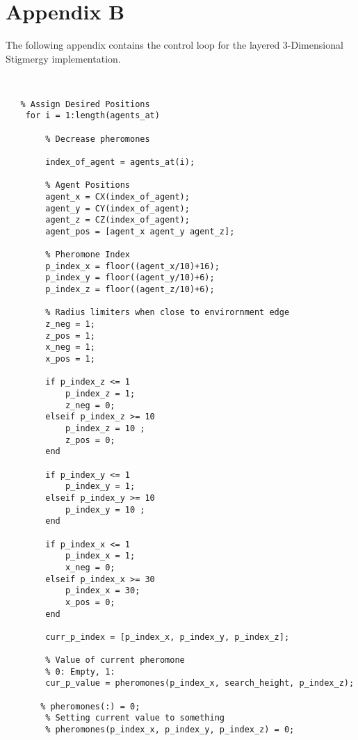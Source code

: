 
\chapter{Appendix B}

The following appendix contains the control loop for the layered 3-Dimensional Stigmergy implementation. \\


\begin{lstlisting}


   % Assign Desired Positions
    for i = 1:length(agents_at)
        
        % Decrease pheromones
        
        index_of_agent = agents_at(i);
        
        % Agent Positions
        agent_x = CX(index_of_agent);
        agent_y = CY(index_of_agent);
        agent_z = CZ(index_of_agent);        
        agent_pos = [agent_x agent_y agent_z];
        
        % Pheromone Index
        p_index_x = floor((agent_x/10)+16);
        p_index_y = floor((agent_y/10)+6);
        p_index_z = floor((agent_z/10)+6);
        
        % Radius limiters when close to envirornment edge
        z_neg = 1;
        z_pos = 1;
        x_neg = 1;
        x_pos = 1;
        
        if p_index_z <= 1 
            p_index_z = 1;
            z_neg = 0;
        elseif p_index_z >= 10 
            p_index_z = 10 ;
            z_pos = 0;
        end
        
        if p_index_y <= 1 
            p_index_y = 1;
        elseif p_index_y >= 10 
            p_index_y = 10 ;
        end
        
        if p_index_x <= 1 
            p_index_x = 1;
            x_neg = 0;
        elseif p_index_x >= 30 
            p_index_x = 30;
            x_pos = 0;
        end
        
        curr_p_index = [p_index_x, p_index_y, p_index_z];
        
        % Value of current pheromone
        % 0: Empty, 1: 
        cur_p_value = pheromones(p_index_x, search_height, p_index_z);
        
       % pheromones(:) = 0;
        % Setting current value to something
        % pheromones(p_index_x, p_index_y, p_index_z) = 0;



\end{lstlisting}
